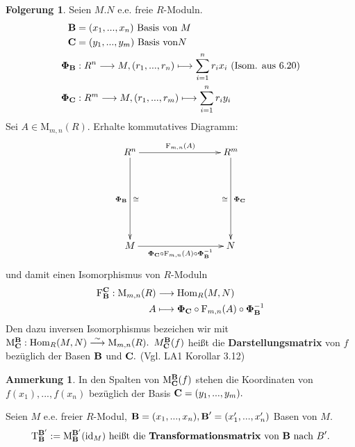 \documentclass[a4paper, titlepage]{article}
\theoremstyle{definition}
\newtheorem{Folgerung}[satz]{Folgerung}
\newtheorem*{anm}{Anmerkung}
\newcommand{\M}{\mathrm{M}}
\newcommand{\Hom}{\mathrm{Hom}}
\newcommand{\F}{\mathrm{F}}
\newcommand{\B}{\text{\textbf{B}}}
\newcommand{\CB}{\text{\textbf{C}}}
\newcommand{\T}[2][1]{\mathrm{T}_{#2}^{#1}}
\newcommand{\MS}[2][1]{\mathrm{M}_{#2}^{#1}}
\newcommand{\id}{\mathrm{id}}
\begin{document}
        \begin{Folgerung}
            Seien $M.N$ e.e. freie $R$-Moduln.
            \begin{align*}
                \B&=(x_1,...,x_n) \text{ Basis von }M\\
                \CB&=(y_1,...,y_m) \text{ Basis von}N\\
                \boldsymbol{\Phi}_{\B}&:R^n\longrightarrow M, (r_1,...,r_n)\longmapsto \sum\limits_{i=1}^{n}r_ix_i \text{ (Isom. aus 6.20)}\\
                \boldsymbol{\Phi}_{\CB}&:R^m\longrightarrow M, (r_1,...,r_m)\longmapsto \sum\limits_{i=1}^{n}r_iy_i 
            \end{align*}
            Sei $A\in \M_{m,n}(R).$ Erhalte kommutatives Diagramm:
            \[
                \begin{xy}
                    \xymatrix{
                       R^n \ar[rrr]^{\F_{m,n}(A)} \ar[ddd]_{\boldsymbol{\Phi}_{\B}}^{\cong} &&& R^m \ar[ddd]_{\cong}^{\boldsymbol{\Phi}_{\CB}}\\
                       &&&\\
                       &&&\\
                       M \ar[rrr]_{\boldsymbol{\Phi}_{\CB}\circ \F_{m,n}(A)\circ \boldsymbol{\Phi}_{\B}^{-1}} &&& N
                    }
        
                \end{xy}
            \] und damit einen Isomorphismus von $R$-Moduln
            \begin{align*}
                \F_{\B}^{\CB}:\M_{m,n}(R)&\longrightarrow \Hom_R(M,N)\\
                A&\longmapsto \boldsymbol{\Phi}_{\CB}\circ \F_{m,n}(A)\circ \boldsymbol{\Phi}_{\B}^{-1}
            \end{align*}
            Den dazu inversen Isomorphismus bezeichen wir mit $\M_{\CB}^{\B}: \Hom_R(M,N)\overset{\sim}{\longrightarrow}\M_{m,n}(R).$
            $M_{\CB}^{\B}(f)$ heißt die \textbf{Darstellungsmatrix} von $f$ bezüglich der Basen $\B$ und $\CB.$ (Vgl. LA1 Korollar 3.12)
        \end{Folgerung}
        \begin{anm}
            In den Spalten von $\M_{\CB}^{\B}(f)$ stehen die Koordinaten von $f(x_1),...,f(x_n)$ bezüglich der Basis $\CB=(y_1,...,y_m).$
        \end{anm}
        \begin{definition}
            Seien $M$ e.e. freier $R$-Modul, $\B=(x_1,...,x_n),\B'=(x_1',...,x_n')$ Basen von $M.$
            $$\T[\B']{\B}:=\MS[\B']{\B}(\id_M)\text{ heißt die \textbf{Transformationsmatrix} von }\B \text{ nach }B'.$$
        \end{definition}
\end{document}
